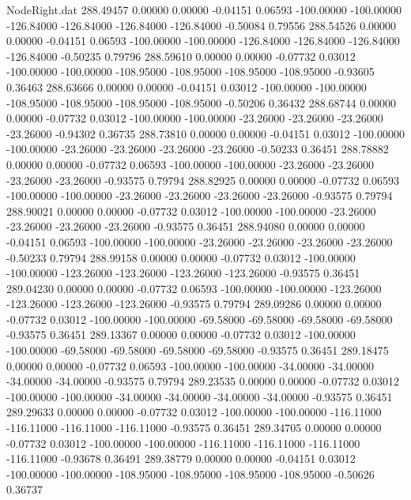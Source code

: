 \begin{filecontents}{NodeRight.dat}
 288.49457    0.00000    0.00000    -0.04151    0.06593 -100.00000 -100.00000 -126.84000 -126.84000 -126.84000 -126.84000   -0.50084    0.79556
 288.54526    0.00000    0.00000    -0.04151    0.06593 -100.00000 -100.00000 -126.84000 -126.84000 -126.84000 -126.84000   -0.50235    0.79796
 288.59610    0.00000    0.00000    -0.07732    0.03012 -100.00000 -100.00000 -108.95000 -108.95000 -108.95000 -108.95000   -0.93605    0.36463
 288.63666    0.00000    0.00000    -0.04151    0.03012 -100.00000 -100.00000 -108.95000 -108.95000 -108.95000 -108.95000   -0.50206    0.36432
 288.68744    0.00000    0.00000    -0.07732    0.03012 -100.00000 -100.00000  -23.26000  -23.26000  -23.26000  -23.26000   -0.94302    0.36735
 288.73810    0.00000    0.00000    -0.04151    0.03012 -100.00000 -100.00000  -23.26000  -23.26000  -23.26000  -23.26000   -0.50233    0.36451
 288.78882    0.00000    0.00000    -0.07732    0.06593 -100.00000 -100.00000  -23.26000  -23.26000  -23.26000  -23.26000   -0.93575    0.79794
 288.82925    0.00000    0.00000    -0.07732    0.06593 -100.00000 -100.00000  -23.26000  -23.26000  -23.26000  -23.26000   -0.93575    0.79794
 288.90021    0.00000    0.00000    -0.07732    0.03012 -100.00000 -100.00000  -23.26000  -23.26000  -23.26000  -23.26000   -0.93575    0.36451
 288.94080    0.00000    0.00000    -0.04151    0.06593 -100.00000 -100.00000  -23.26000  -23.26000  -23.26000  -23.26000   -0.50233    0.79794
 288.99158    0.00000    0.00000    -0.07732    0.03012 -100.00000 -100.00000 -123.26000 -123.26000 -123.26000 -123.26000   -0.93575    0.36451
 289.04230    0.00000    0.00000    -0.07732    0.06593 -100.00000 -100.00000 -123.26000 -123.26000 -123.26000 -123.26000   -0.93575    0.79794
 289.09286    0.00000    0.00000    -0.07732    0.03012 -100.00000 -100.00000  -69.58000  -69.58000  -69.58000  -69.58000   -0.93575    0.36451
 289.13367    0.00000    0.00000    -0.07732    0.03012 -100.00000 -100.00000  -69.58000  -69.58000  -69.58000  -69.58000   -0.93575    0.36451
 289.18475    0.00000    0.00000    -0.07732    0.06593 -100.00000 -100.00000  -34.00000  -34.00000  -34.00000  -34.00000   -0.93575    0.79794
 289.23535    0.00000    0.00000    -0.07732    0.03012 -100.00000 -100.00000  -34.00000  -34.00000  -34.00000  -34.00000   -0.93575    0.36451
 289.29633    0.00000    0.00000    -0.07732    0.03012 -100.00000 -100.00000 -116.11000 -116.11000 -116.11000 -116.11000   -0.93575    0.36451
 289.34705    0.00000    0.00000    -0.07732    0.03012 -100.00000 -100.00000 -116.11000 -116.11000 -116.11000 -116.11000   -0.93678    0.36491
 289.38779    0.00000    0.00000    -0.04151    0.03012 -100.00000 -100.00000 -108.95000 -108.95000 -108.95000 -108.95000   -0.50626    0.36737

\end{filecontents}
